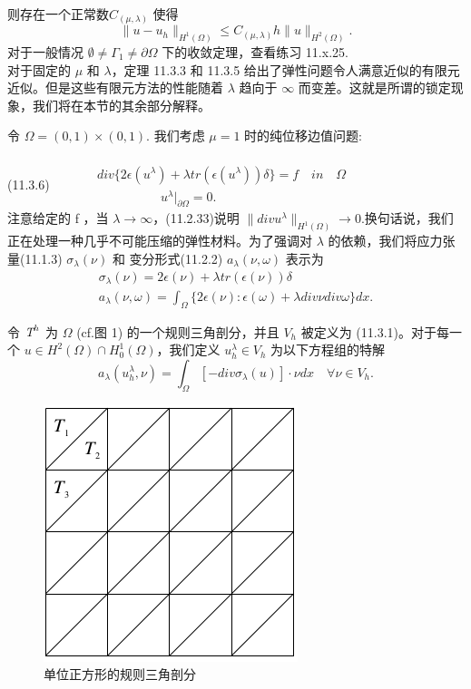 \documentclass[UTF8,titlepage]{ctexart}
\begin{document}
\\
则存在一个正常数$C_{(\mu, \lambda)}$ 使得
$$
	\| u - u_h \|_{H^1(\Omega)} \le C_{(\mu, \lambda)} h \| u \|_{H^2(\Omega)}.
$$
对于一般情况 $ \emptyset \ne \Gamma_1 \ne \partial \Omega $ 下的收敛定理，查看练习 11.x.25. 
\\
对于固定的 $\mu$ 和 $\lambda$，定理 11.3.3 和 11.3.5 给出了弹性问题令人满意近似的有限元近似。但是这些有限元方法的性能随着 $\lambda$ 趋向于 $\infty$ 而变差。这就是所谓的锁定现象，我们将在本节的其余部分解释。
\par 
令 $\Omega = (0,1) \times (0,1)$. 我们考虑 $\mu = 1$ 时的纯位移边值问题:
\\ \\
(11.3.6)
$
\quad \quad \quad
\begin{matrix}
	div \{ 2 \epsilon (u^{\lambda}) + \lambda tr (\epsilon (u^{\lambda})) \delta \} = f \quad in \quad \Omega \\ \quad \quad \quad \quad \quad 
	u^{\lambda}|_{\partial \Omega} =  0.
\end{matrix}
$
\\
注意给定的 f ，当 $\lambda \to \infty$，(11.2.33)说明 $\| div u^{\lambda} \|_{H^1(\Omega)} \to 0$.换句话说，我们正在处理一种几乎不可能压缩的弹性材料。为了强调对 $\lambda$ 的依赖，我们将应力张量(11.1.3) $\sigma_{\lambda}(\nu)$ 和 变分形式(11.2.2) $a_{\lambda}(\nu,\omega)$ 表示为
$$
\begin{matrix}
	\sigma_{\lambda}(\nu) = 2 \epsilon(\nu) + \lambda tr (\epsilon(\nu)) \delta \\
	a_{\lambda}(\nu,\omega) = \int_{\Omega} \{ 2 \epsilon(\nu) : \epsilon(\omega) + \lambda div \nu div \omega \} dx.
\end{matrix}
$$

令 $\emph{T}^h$ 为 $\Omega $ (cf.图 1) 的一个规则三角剖分，并且 $V_h$ 被定义为 (11.3.1)。对于每一个 $u \in H^2(\Omega) \cap H_0^1(\Omega)$，我们定义 $u_h^{\lambda} \in V_h$ 为以下方程组的特解
$$
	a_{\lambda}(u_h^{\lambda},\nu) = \int_{\Omega} 
	[ -div \sigma_{\lambda}(u) ] \cdot \nu dx \quad \forall \nu \in V_h.
$$

\begin{figure}[hb]
	\centering
	\includegraphics{../image/Fig.11.1.png}
	\caption{单位正方形的规则三角剖分}
\end{figure}
\end{document}
